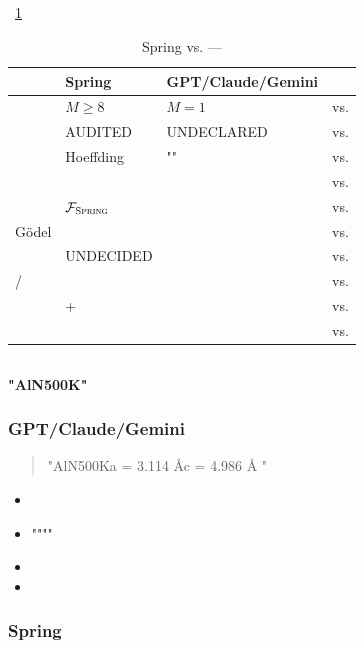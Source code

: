 \documentclass[12pt,a4paper]{article}
\theoremstyle{remark}
\newcommand{\Fset}{\mathcal{F}}
\newcommand{\Spring}{\textsc{Spring}}
\begin{document}
\subsection{}

~\ref{tab:comparison}

\begin{table}[H]
\centering
\caption{Spring vs.  — }
\label{tab:comparison}
\renewcommand{\arraystretch}{1.7}
\small
\begin{tabular}{p{2.8cm} p{3.2cm} p{3.2cm} p{3.2cm}}
\toprule
\textbf{} & \textbf{Spring} & \textbf{GPT/Claude/Gemini} & \textbf{} \\
\midrule
 & $M \geq 8$ & $M=1$ &  vs.  \\
 & \textsc{AUDITED} & \textsc{UNDECLARED} &  vs.  \\
 & Hoeffding & "" &  vs.  \\
 &  &  &  vs.  \\
 & $\Fset_{\Spring}$ &  &  vs.  \\
G\"odel &  &  &  vs.  \\
 & UNDECIDED &  &  vs.  \\
/ &  &  &  vs.  \\
 & + &  &  vs.  \\
 &  &  &  vs.  \\
\bottomrule
\end{tabular}
\end{table}

\subsection{}

\textbf{"AlN500K"}

\subsubsection*{GPT/Claude/Gemini}

\begin{quote}
\small
"AlN500Ka = 3.114 {\AA}c = 4.986 {\AA}
" 
\end{quote}


\begin{itemize}[nosep]
    \item 
    \item """"
    \item 
    \item 
\end{itemize}

\subsubsection*{Spring}
\end{document}
